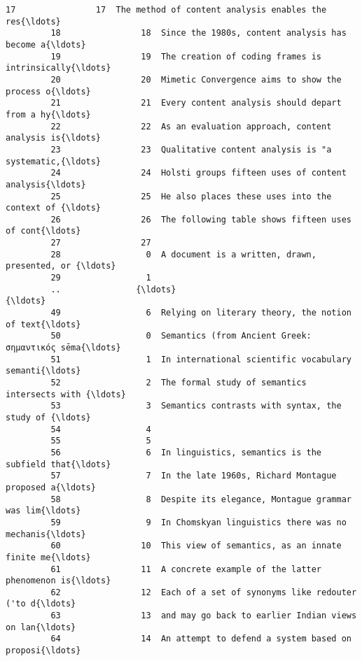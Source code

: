 \documentclass[11pt]{article}
\begin{document}
\begin{Verbatim}[commandchars=\\\{\}]
         17                17  The method of content analysis enables the res{\ldots}   
         18                18  Since the 1980s, content analysis has become a{\ldots}   
         19                19  The creation of coding frames is intrinsically{\ldots}   
         20                20  Mimetic Convergence aims to show the process o{\ldots}   
         21                21  Every content analysis should depart from a hy{\ldots}   
         22                22  As an evaluation approach, content analysis is{\ldots}   
         23                23  Qualitative content analysis is "a systematic,{\ldots}   
         24                24  Holsti groups fifteen uses of content analysis{\ldots}   
         25                25  He also places these uses into the context of {\ldots}   
         26                26  The following table shows fifteen uses of cont{\ldots}   
         27                27                                                      
         28                 0  A document is a written, drawn, presented, or {\ldots}   
         29                 1                                                      
         ..               {\ldots}                                                {\ldots}   
         49                 6  Relying on literary theory, the notion of text{\ldots}   
         50                 0  Semantics (from Ancient Greek: σημαντικός sēma{\ldots}   
         51                 1  In international scientific vocabulary semanti{\ldots}   
         52                 2  The formal study of semantics intersects with {\ldots}   
         53                 3  Semantics contrasts with syntax, the study of {\ldots}   
         54                 4                                                      
         55                 5                                                      
         56                 6  In linguistics, semantics is the subfield that{\ldots}   
         57                 7  In the late 1960s, Richard Montague proposed a{\ldots}   
         58                 8  Despite its elegance, Montague grammar was lim{\ldots}   
         59                 9  In Chomskyan linguistics there was no mechanis{\ldots}   
         60                10  This view of semantics, as an innate finite me{\ldots}   
         61                11  A concrete example of the latter phenomenon is{\ldots}   
         62                12  Each of a set of synonyms like redouter ('to d{\ldots}   
         63                13  and may go back to earlier Indian views on lan{\ldots}   
         64                14  An attempt to defend a system based on proposi{\ldots}   

\end{Verbatim}
\end{document}
